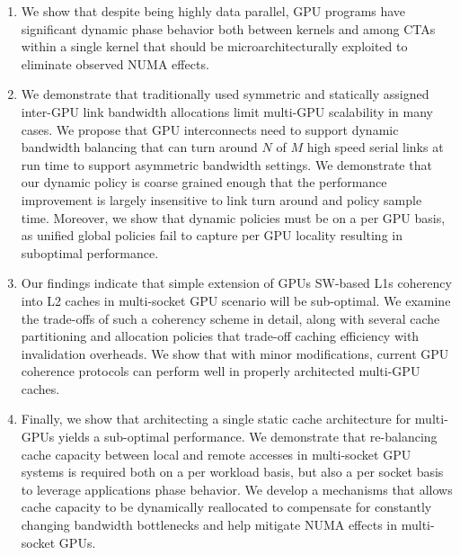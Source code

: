 \begin{enumerate}
\item
We show that despite being highly data parallel, GPU programs have significant
dynamic phase behavior both between kernels and among CTAs within a single
kernel that should be microarchitecturally exploited to eliminate observed
NUMA effects.

\item
We demonstrate that traditionally used symmetric and statically assigned inter-GPU link bandwidth allocations 
limit multi-GPU scalability in many cases. We propose
that GPU interconnects need to support dynamic bandwidth balancing that can
turn around $N$ of $M$ high speed serial links at run time to support asymmetric
bandwidth settings. We demonstrate that our dynamic policy is coarse
grained enough that the performance improvement is largely insensitive to link turn 
around and policy sample time. Moreover, we show that dynamic policies must be on a
per GPU basis, as unified global policies fail to capture per GPU locality
resulting in suboptimal performance.

\item
Our findings indicate that simple extension of GPUs SW-based L1s coherency into
L2 caches in multi-socket GPU scenario will be sub-optimal.  
We examine the trade-offs of such a coherency scheme in detail, 
along with several cache partitioning and allocation policies that trade-off
caching efficiency with invalidation overheads. We show that with minor modifications, 
current GPU coherence protocols can perform well in properly architected multi-GPU caches.

\item Finally, we show that architecting a single static cache architecture for
multi-GPUs yields a sub-optimal performance. We demonstrate that re-balancing cache
capacity between local and remote accesses in multi-socket GPU systems is
required both on a per workload basis, but also a per socket basis to leverage
applications phase behavior. We develop a mechanisms that allows cache capacity
to be dynamically reallocated to compensate for constantly changing bandwidth
bottlenecks and help mitigate NUMA effects in multi-socket GPUs.






\end{enumerate}
